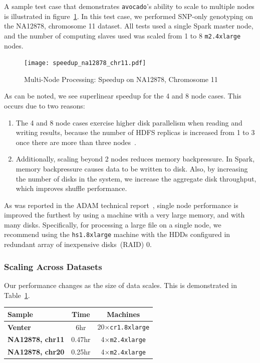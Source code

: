 \documentclass{acm_proc_article-sp}
\begin{document}
A sample test case that demonstrates \texttt{avocado}'s ability to scale to multiple nodes is illustrated in figure~\ref{fig:speedup}. In this
test case, we performed SNP-only genotyping on the NA12878, chromosome 11 dataset. All tests used a single Spark master node, and
the number of computing slaves used was scaled from 1 to 8 \texttt{m2.4xlarge} nodes.

\begin{figure}[h]
\begin{center}
\texttt{[image: speedup\_na12878\_chr11.pdf]}
\end{center}
\caption{Multi-Node Processing: Speedup on NA12878, Chromosome 11}
\label{fig:speedup}
\end{figure}

As can be noted, we see superlinear speedup for the 4 and 8 node cases. This occurs due to two reasons:

\begin{enumerate}
\item The 4 and 8 node cases exercise higher disk parallelism when reading and writing results, because the number of HDFS replicas
is increased from 1 to 3 once there are more than three nodes~\cite{borthakur07}.
\item Additionally, scaling beyond 2 nodes reduces memory backpressure. In Spark, memory backpressure causes data to be written to
disk. Also, by increasing the number of disks in the system, we increase the aggregate disk throughput, which improves shuffle performance.
\end{enumerate}

As was reported in the ADAM technical report~\cite{massie13}, single node performance is improved the furthest by using a machine
with a very large memory, and with many disks. Specifically, for processing a large file on a single node, we recommend using the
\texttt{hs1.8xlarge} machine with the HDDs configured in redundant array of inexpensive disks~(RAID) 0.

\subsubsection{Scaling Across Datasets}
\label{sec:scaling-across-datasets}

Our performance changes as the size of data scales. This is demonstrated in Table~\ref{tab:scaling}.

\begin{table}[h]
\begin{center}
\begin{tabular}{| l || c | c |}
\hline
\bf Sample & \bf Time & \bf Machines \\
\hline
\hline
\bf Venter & 6hr & 20$\times$\texttt{cr1.8xlarge} \\
\bf NA12878, chr11 & 0.47hr & 4$\times$\texttt{m2.4xlarge} \\
\bf NA12878, chr20 & 0.25hr & 4$\times$\texttt{m2.4xlarge} \\
\hline
\end{tabular}
\end{center}
\label{tab:scaling}
\end{table}
\end{document}
